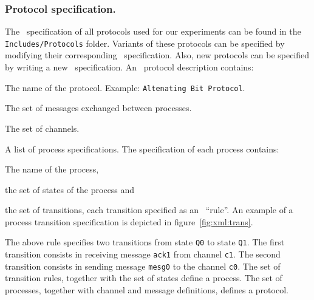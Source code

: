 \subsubsection*{Protocol specification.}

The \Xml\ specification of all protocols used for our experiments can be found in the \texttt{Includes/Protocols} folder.
%
Variants of these protocols can be specified by modifying their corresponding \Xml\ specification.
Also, new protocols can be specified by writing a new \xml\ specification.
%
An \Xml\ protocol description contains:
\begin{inparaenum}
\item The name of the protocol. Example: \texttt{Altenating Bit Protocol}.
\item The set of messages exchanged between processes.
\item The set of channels.
\item A list of process specifications. The specification of each process contains:
\begin{inparaenum}
\item The name of the process,
\item the set of states of the process and
\item the set of transitions, each transition specified as an \Xml\ ``rule''. An example of a process transition specification is depicted in figure~\ref{fig:xml:trans}.
\end{inparaenum}
\end{inparaenum}

The above rule specifies two transitions from  state {\tt Q0} to  state {\tt Q1}.
The first transition consists in receiving message {\tt ack1} from channel {\tt c1}.
The second transition consists in sending message {\tt mesg0} to the channel {\tt c0}.
The set of transition rules, together with the set of states define a process.
The set of processes, together with channel and message definitions, defines a protocol.



